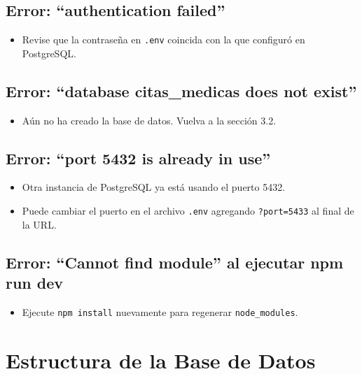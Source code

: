 \documentclass[12pt,a4paper]{article}
\begin{document}
\subsection{Error: ``authentication failed''}
\begin{itemize}
    \item Revise que la contraseña en \texttt{.env} coincida con la que configuró en PostgreSQL.
\end{itemize}

\subsection{Error: ``database citas\_medicas does not exist''}
\begin{itemize}
    \item Aún no ha creado la base de datos. Vuelva a la sección 3.2.
\end{itemize}

\subsection{Error: ``port 5432 is already in use''}
\begin{itemize}
    \item Otra instancia de PostgreSQL ya está usando el puerto 5432.
    \item Puede cambiar el puerto en el archivo \texttt{.env} agregando \texttt{?port=5433} al final de la URL.
\end{itemize}

\subsection{Error: ``Cannot find module'' al ejecutar npm run dev}
\begin{itemize}
    \item Ejecute \texttt{npm install} nuevamente para regenerar \texttt{node\_modules}.
\end{itemize}

\section{Estructura de la Base de Datos}
\end{document}
